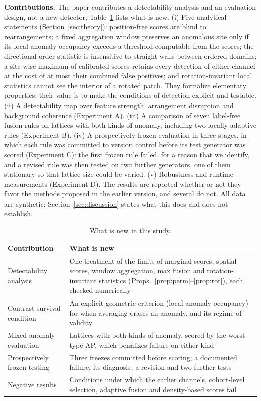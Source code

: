 \textbf{Contributions.} The paper contributes a detectability analysis and an evaluation design, not a new detector; Table~\ref{tab:contrib} lists what is new. (i) Five analytical statements (Section~\ref{sec:theory}): position-free scores are blind to rearrangements; a fixed aggregation window preserves an anomalous site only if its local anomaly occupancy exceeds a threshold computable from the scores; the directional order statistic is insensitive to straight walls between ordered domains; a site-wise maximum of calibrated scores retains every detection of either channel at the cost of at most their combined false positives; and rotation-invariant local statistics cannot see the interior of a rotated patch. They formalize elementary properties; their value is to make the conditions of detection explicit and testable. (ii) A detectability map over feature strength, arrangement disruption and background coherence (Experiment A). (iii) A comparison of seven label-free fusion rules on lattices with both kinds of anomaly, including two locally adaptive rules (Experiment B). (iv) A prospectively frozen evaluation in three stages, in which each rule was committed to version control before its test generator was scored (Experiment C): the first frozen rule failed, for a reason that we identify, and a revised rule was then tested on two further generators, one of them stationary so that lattice size could be varied. (v) Robustness and runtime measurements (Experiment D). The results are reported whether or not they favor the methods proposed in the earlier version, and several do not. All data are synthetic; Section~\ref{sec:discussion} states what this does and does not establish.

\begin{table}[t]
\caption{What is new in this study.}
\label{tab:contrib}
\centering\small
\begin{tabular}{p{3.6cm}p{10.2cm}}
\toprule
Contribution & What is new\\
\midrule
Detectability analysis & One treatment of the limits of marginal scores, spatial scores, window aggregation, max fusion and rotation-invariant statistics (Props.~\ref{prop:perm}--\ref{prop:rot}), each checked numerically\\
Contrast-survival condition & An explicit geometric criterion (local anomaly occupancy) for when averaging erases an anomaly, and its regime of validity\\
Mixed-anomaly evaluation & Lattices with both kinds of anomaly, scored by the worst-type AP, which penalizes failure on either kind\\
Prospectively frozen testing & Three freezes committed before scoring; a documented failure, its diagnosis, a revision and two further tests\\
Negative results & Conditions under which the earlier channels, cohort-level selection, adaptive fusion and density-based scores fail\\
\bottomrule
\end{tabular}
\end{table}

